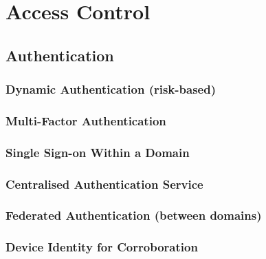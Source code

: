 \hypertarget{access-control}{%
\chapter{Access Control}\label{access-control}}

\hypertarget{authentication}{%
\section{Authentication}\label{authentication}}

\hypertarget{dynamic-authentication-risk-based}{%
\subsection{Dynamic Authentication
(risk-based)}\label{dynamic-authentication-risk-based}}

\hypertarget{multi-factor-authentication}{%
\subsection{Multi-Factor
Authentication}\label{multi-factor-authentication}}

\hypertarget{single-sign-on-within-a-domain}{%
\subsection{Single Sign-on Within a
Domain}\label{single-sign-on-within-a-domain}}

\hypertarget{centralised-authentication-service}{%
\subsection{Centralised Authentication
Service}\label{centralised-authentication-service}}

\hypertarget{federated-authentication-between-domains}{%
\subsection{Federated Authentication (between
domains)}\label{federated-authentication-between-domains}}

\hypertarget{device-identity-for-corroboration}{%
\subsection{Device Identity for
Corroboration}\label{device-identity-for-corroboration}}

